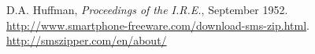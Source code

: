  D.A. Huffman, {\it Proceedings of the I.R.E.}, September 1952.
 {\url{http://www.smartphone-freeware.com/download-sms-zip.html}}.
 {\url{http://smszipper.com/en/about/}}



